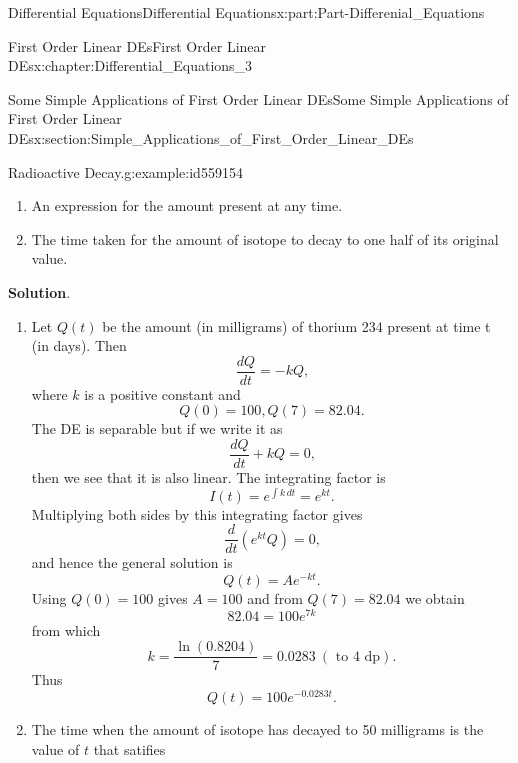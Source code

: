 \documentclass[oneside,10pt,]{book}
\newcommand{\blocktitlefont}{\relax}
\numberwithin{equation}{section}
\begin{document}
\begin{partptx}{Differential Equations}{}{Differential Equations}{}{}{x:part:Part-Differenial_Equations}
\begin{chapterptx}{First Order Linear DEs}{}{First Order Linear DEs}{}{}{x:chapter:Differential_Equations_3}
\begin{sectionptx}{Some Simple Applications of First Order Linear DEs}{}{Some Simple Applications of First Order Linear DEs}{}{}{x:section:Simple_Applications_of_First_Order_Linear_DEs}
\begin{example}{Radioactive Decay.}{g:example:id559154}
\begin{enumerate}[label=\alph*]
\item{}An expression for the amount present at any time.%
\item{}The time taken for the amount of isotope to decay to one half of its original value.%
\end{enumerate}
%
%
\par\smallskip%
\noindent\textbf{\blocktitlefont Solution}.\hypertarget{g:solution:id559202}{}\quad{}%
\begin{enumerate}[label=\alph*]
\item{}Let \(Q(t)\) be the amount (in milligrams) of thorium 234 present at time t (in days). Then%
\begin{equation*}
\dfrac{dQ}{dt} = -kQ\text{,}
\end{equation*}
where \(k\) is a positive constant and%
\begin{equation*}
Q(0) = 100, Q(7) = 82.04\text{.}
\end{equation*}
The DE is separable but if we write it as%
\begin{equation*}
\dfrac{dQ}{dt} + kQ = 0\text{,}
\end{equation*}
then we see that it is also linear. The integrating factor is%
\begin{equation*}
I(t) = e^{\int k \, dt} = e^{kt}\text{.}
\end{equation*}
Multiplying both sides by this integrating factor gives%
\begin{equation*}
\dfrac{d}{dt} \left( e^{kt} Q \right) = 0\text{,}
\end{equation*}
and hence the general solution is%
\begin{equation*}
Q(t) = Ae^{-kt}\text{.}
\end{equation*}
Using \(Q(0) = 100\) gives \(A = 100\) and from \(Q(7) = 82.04\) we obtain%
\begin{equation*}
82.04 = 100 e^{7k}
\end{equation*}
from which%
\begin{equation*}
k = \dfrac{\ln (0.8204)}{7} = 0.0283 \: (\text{ to 4 dp})\text{.}
\end{equation*}
Thus%
\begin{equation*}
Q(t) = 100 e^{-0.0283t}\text{.}
\end{equation*}
%
\item{}The time when the amount of isotope has decayed to 50 milligrams is the value of \(t\) that satifies%
\begin{equation*}

\end{equation*}
\end{enumerate}
\end{example}
\end{sectionptx}
\end{chapterptx}
\end{partptx}
\end{document}
